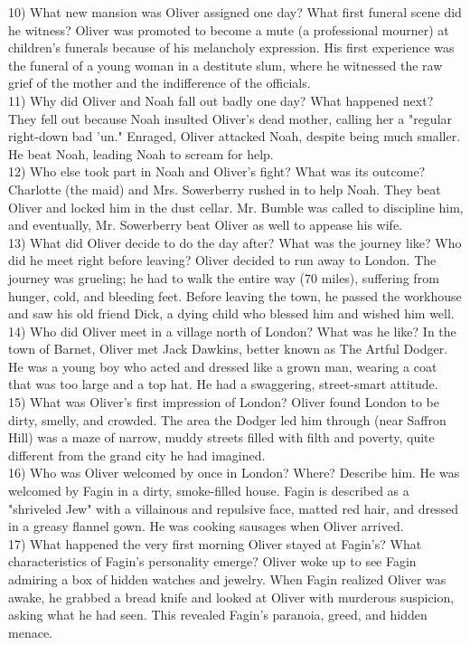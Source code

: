 \documentclass[12pt]{article}
\begin{document}
10) What new mansion was Oliver assigned one day? What first funeral scene did he witness? Oliver was promoted to become a mute (a professional mourner) at children's funerals because of his melancholy expression. His first experience was the funeral of a young woman in a destitute slum, where he witnessed the raw grief of the mother and the indifference of the officials. \\
11) Why did Oliver and Noah fall out badly one day? What happened next? They fell out because Noah insulted Oliver’s dead mother, calling her a "regular right-down bad 'un." Enraged, Oliver attacked Noah, despite being much smaller. He beat Noah, leading Noah to scream for help. \\
12) Who else took part in Noah and Oliver’s fight? What was its outcome? Charlotte (the maid) and Mrs. Sowerberry rushed in to help Noah. They beat Oliver and locked him in the dust cellar. Mr. Bumble was called to discipline him, and eventually, Mr. Sowerberry beat Oliver as well to appease his wife. \\
13) What did Oliver decide to do the day after? What was the journey like? Who did he meet right before leaving? Oliver decided to run away to London. The journey was grueling; he had to walk the entire way (70 miles), suffering from hunger, cold, and bleeding feet. Before leaving the town, he passed the workhouse and saw his old friend Dick, a dying child who blessed him and wished him well. \\
14) Who did Oliver meet in a village north of London? What was he like? In the town of Barnet, Oliver met Jack Dawkins, better known as The Artful Dodger. He was a young boy who acted and dressed like a grown man, wearing a coat that was too large and a top hat. He had a swaggering, street-smart attitude. \\
15) What was Oliver’s first impression of London? Oliver found London to be dirty, smelly, and crowded. The area the Dodger led him through (near Saffron Hill) was a maze of narrow, muddy streets filled with filth and poverty, quite different from the grand city he had imagined. \\
16) Who was Oliver welcomed by once in London? Where? Describe him. He was welcomed by Fagin in a dirty, smoke-filled house. Fagin is described as a "shriveled Jew" with a villainous and repulsive face, matted red hair, and dressed in a greasy flannel gown. He was cooking sausages when Oliver arrived. \\
17) What happened the very first morning Oliver stayed at Fagin’s? What characteristics of Fagin’s personality emerge? Oliver woke up to see Fagin admiring a box of hidden watches and jewelry. When Fagin realized Oliver was awake, he grabbed a bread knife and looked at Oliver with murderous suspicion, asking what he had seen. This revealed Fagin's paranoia, greed, and hidden menace. \\
\end{document}

